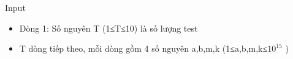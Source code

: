 Input
\begin{itemize}
	\item     Dòng 1: Số nguyên T (1≤T≤10) là số lượng test   
	\item     T dòng tiếp theo, mỗi dòng gồm 4 số nguyên a,b,m,k (1≤a,b,m,k≤$10^{15}$    )   
\end{itemize}
